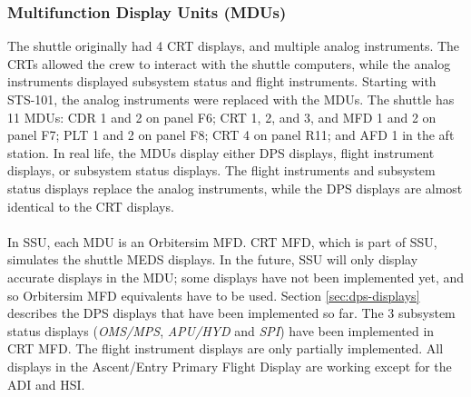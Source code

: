 \documentclass[Space_Shuttle_Ultra_Manual.tex]{subfiles}
\begin{document}
\begin{multicols*}{2}
\subsubsection{Multifunction Display Units (MDUs)}
The shuttle originally had 4 CRT displays, and multiple analog instruments.
The CRTs allowed the crew to interact with the shuttle computers, while the analog instruments displayed subsystem status and flight instruments.
Starting with STS-101, the analog instruments were replaced with the MDUs.
The shuttle has 11 MDUs: CDR 1 and 2 on panel F6; CRT 1, 2, and 3, and MFD 1 and 2 on panel F7; PLT 1 and 2 on panel F8; CRT 4 on panel R11; and AFD 1 in the aft station.
In real life, the MDUs display either DPS displays, flight instrument displays, or subsystem status displays.
The flight instruments and subsystem status displays replace the analog instruments, while the DPS displays are almost identical to the CRT displays.\\
\\
In SSU, each MDU is an Orbitersim MFD. CRT MFD, which is part of SSU, simulates the shuttle MEDS displays. In the future, SSU will only display accurate displays in the MDU; some displays have not been implemented yet, and so Orbitersim MFD equivalents have to be used.
Section \ref{sec:dps-displays} describes the DPS displays that have been implemented so far.
The 3 subsystem status displays (\textit{OMS/MPS}, \textit{APU/HYD} and \textit{SPI}) have been implemented in CRT MFD.
The flight instrument displays are only partially implemented. All displays in the Ascent/Entry Primary Flight Display are working except for the ADI and HSI.
\end{multicols*}
\end{document}
